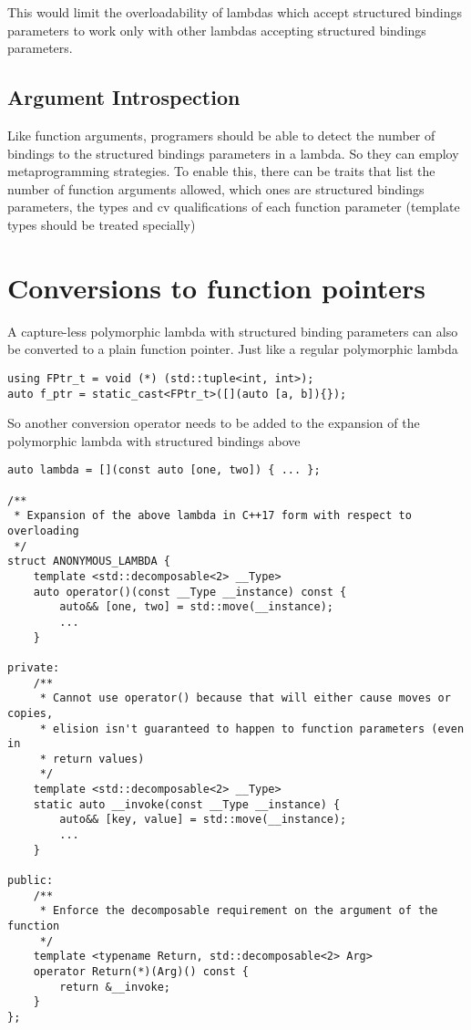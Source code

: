\documentclass{article}
\begin{document}
This would limit the overloadability of lambdas which accept structured
bindings parameters to work only with other lambdas accepting structured
bindings parameters.

\subsection{Argument Introspection}
Like function arguments, programers should be able to detect the number of
bindings to the structured bindings parameters in a lambda.  So they can
employ metaprogramming strategies.  To enable this, there can be traits that
list the number of function arguments allowed, which ones are structured
bindings parameters, the types and cv qualifications of each function
parameter (template types should be treated specially)


\section{Conversions to function pointers}
A capture-less polymorphic lambda with structured binding parameters can also
be converted to a plain function pointer.  Just like a regular polymorphic
lambda

\begin{lstlisting}
using FPtr_t = void (*) (std::tuple<int, int>);
auto f_ptr = static_cast<FPtr_t>([](auto [a, b]){});
\end{lstlisting}

So another conversion operator needs to be added to the expansion of the
polymorphic lambda with structured bindings above

\begin{lstlisting}
auto lambda = [](const auto [one, two]) { ... };

/**
 * Expansion of the above lambda in C++17 form with respect to overloading
 */
struct ANONYMOUS_LAMBDA {
    template <std::decomposable<2> __Type>
    auto operator()(const __Type __instance) const {
        auto&& [one, two] = std::move(__instance);
        ...
    }

private:
    /**
     * Cannot use operator() because that will either cause moves or copies,
     * elision isn't guaranteed to happen to function parameters (even in
     * return values)
     */
    template <std::decomposable<2> __Type>
    static auto __invoke(const __Type __instance) {
        auto&& [key, value] = std::move(__instance);
        ...
    }

public:
    /**
     * Enforce the decomposable requirement on the argument of the function
     */
    template <typename Return, std::decomposable<2> Arg>
    operator Return(*)(Arg)() const {
        return &__invoke;
    }
};
\end{lstlisting}
\end{document}
